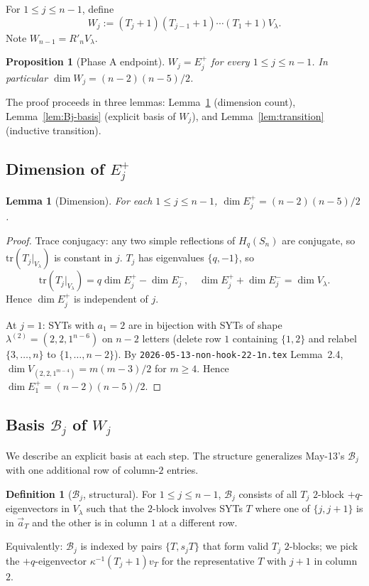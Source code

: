 \documentclass[11pt]{article}
\newtheorem{lemma}[theorem]{Lemma}
\newtheorem{proposition}[theorem]{Proposition}
\theoremstyle{definition}
\newtheorem{definition}[theorem]{Definition}
\begin{document}
For $1\le j\le n-1$, define
\[
   W_j:=(T_j{+}1)(T_{j-1}{+}1)\cdots(T_1{+}1)V_\lambda.
\]
Note $W_{n-1}=R'_nV_\lambda$.

\begin{proposition}[Phase A endpoint]\label{prop:phaseA}
$W_j=E_j^+$ for every $1\le j\le n-1$.  In particular
$\dim W_j=(n-2)(n-5)/2$.
\end{proposition}

The proof proceeds in three lemmas:
Lemma~\ref{lem:Ej-dim} (dimension count),
Lemma~\ref{lem:Bj-basis} (explicit basis of $W_j$),
and Lemma~\ref{lem:transition} (inductive transition).

\subsection{Dimension of $E_j^+$}

\begin{lemma}[Dimension]\label{lem:Ej-dim}
For each $1\le j\le n-1$, $\dim E_j^+=(n-2)(n-5)/2$.
\end{lemma}

\begin{proof}
Trace conjugacy: any two simple reflections of $H_q(S_n)$ are
conjugate, so $\mathrm{tr}(T_j|_{V_\lambda})$ is constant in $j$.
$T_j$ has eigenvalues $\{q,-1\}$, so
\[
   \mathrm{tr}(T_j|_{V_\lambda})=q\dim E_j^+ - \dim E_j^-,\quad
   \dim E_j^+ + \dim E_j^- = \dim V_\lambda.
\]
Hence $\dim E_j^+$ is independent of $j$.

At $j=1$: SYTs with $a_1=2$ are in bijection with SYTs of shape
$\lambda^{(2)}=(2,2,1^{n-6})$ on $n-2$ letters (delete row $1$
containing $\{1,2\}$ and relabel $\{3,\ldots,n\}$ to
$\{1,\ldots,n-2\}$).  By
\texttt{2026-05-13-non-hook-22-1n.tex} Lemma~2.4,
$\dim V_{(2,2,1^{m-4})}=m(m-3)/2$ for $m\ge 4$.  Hence
$\dim E_1^+=(n-2)(n-5)/2$.
\end{proof}

\subsection{Basis $\mathcal{B}_j$ of $W_j$}

We describe an explicit basis at each step.  The structure
generalizes May-13's $\mathcal{B}_j$ with one additional row of
column-$2$ entries.

\begin{definition}[$\mathcal{B}_j$, structural]\label{def:Bj}
For $1\le j\le n-1$, $\mathcal{B}_j$ consists of all $T_j$
$2$-block $+q$-eigenvectors in $V_\lambda$ such that the $2$-block
involves SYTs $T$ where one of $\{j,j+1\}$ is in $\vec{a}_T$ and
the other is in column $1$ at a different row.

Equivalently: $\mathcal{B}_j$ is indexed by pairs $\{T,s_jT\}$ that
form valid $T_j$ $2$-blocks; we pick the $+q$-eigenvector
$\kappa^{-1}(T_j{+}1)v_T$ for the representative $T$ with $j+1$ in
column $2$.
\end{definition}
\end{document}
